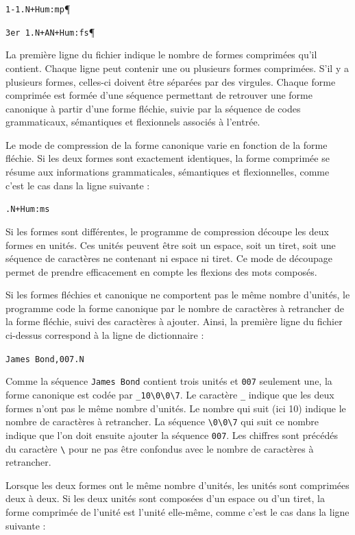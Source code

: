 \verb$1-1.N+Hum:mp$\P

\verb$3er 1.N+AN+Hum:fs$\P

\bigskip
\noindent La première ligne du fichier indique le nombre de formes comprimées qu’il contient.
Chaque ligne peut contenir une ou plusieurs formes comprimées. S’il y a plusieurs formes,
celles-ci doivent être séparées par des virgules. Chaque forme comprimée est formée d’une
séquence permettant de retrouver une forme canonique à partir d’une forme fléchie, suivie
par la séquence de codes grammaticaux, sémantiques et flexionnels associés à l’entrée.


\bigskip
\noindent Le mode de compression de la forme canonique varie en fonction de la forme fléchie.
Si les deux formes sont exactement identiques, la forme comprimée se résume aux informations
grammaticales, sémantiques et flexionnelles, comme c’est le cas dans la ligne suivante :

\bigskip
\verb$.N+Hum:ms$

\bigskip
\noindent Si les formes sont différentes, le programme de compression découpe les deux formes en
unités. Ces unités peuvent être soit un espace, soit un tiret, soit une séquence de caractères
ne contenant ni espace ni tiret. Ce mode de découpage permet de prendre efficacement en
compte les flexions des mots composés.


\bigskip
\noindent Si les formes fléchies et canonique ne comportent pas le même nombre d’unités, le
programme code la forme canonique par le nombre de caractères à retrancher de la forme fléchie,
suivi des caractères à ajouter. Ainsi, la première ligne du fichier ci-dessus correspond à la ligne
de dictionnaire :


\bigskip
\verb+James Bond,007.N+

\bigskip
\noindent Comme la séquence \verb+James Bond+ contient trois unités et \verb+007+ seulement une, la
forme canonique est codée par \verb+_10\0\0\7+. Le caractère \verb+_+ indique que les deux formes
n’ont pas le même nombre d’unités. Le nombre qui suit (ici 10) indique le nombre de caractères à
retrancher. La séquence \verb+\0\0\7+ qui suit ce nombre indique que l’on doit ensuite ajouter la
séquence \verb+007+. Les chiffres sont précédés du caractère \verb+\+ pour ne pas être confondus
avec le nombre de caractères à retrancher.


\bigskip
\noindent Lorsque les deux formes ont le même nombre d’unités, les unités sont comprimées deux
à deux. Si les deux unités sont composées d’un espace ou d’un tiret, la forme comprimée de
l’unité est l’unité elle-même, comme c’est le cas dans la ligne suivante :


